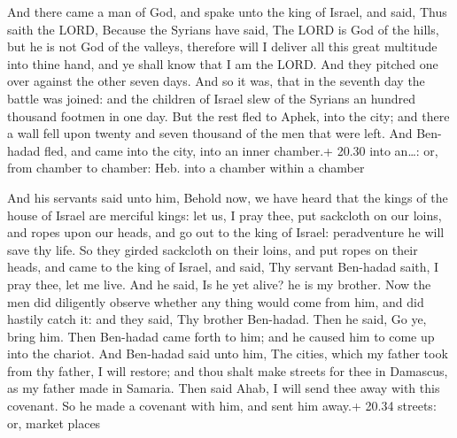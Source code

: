  And there came a man of God, and spake unto the king of
Israel, and said, Thus saith the LORD, Because the Syrians have said,
The LORD is God of the hills, but he is not God of the valleys,
therefore will I deliver all this great multitude into thine hand, and
ye shall know that I am the LORD.  And they pitched one
over against the other seven days. And so it was, that in the seventh
day the battle was joined: and the children of Israel slew of the
Syrians an hundred thousand footmen in one day.  But the
rest fled to Aphek, into the city; and there a wall fell upon twenty and
seven thousand of the men that were left. And Ben-hadad fled, and came
into the city, into an inner chamber.+ 20.30 into an\ldots: or, from
chamber to chamber: Heb. into a chamber within a chamber

 And his servants said unto him, Behold now, we have
heard that the kings of the house of Israel are merciful kings: let us,
I pray thee, put sackcloth on our loins, and ropes upon our heads, and
go out to the king of Israel: peradventure he will save thy life.
 So they girded sackcloth on their loins, and put ropes on
their heads, and came to the king of Israel, and said, Thy servant
Ben-hadad saith, I pray thee, let me live. And he said, Is he yet alive?
he is my brother.  Now the men did diligently observe
whether any thing would come from him, and did hastily catch it: and
they said, Thy brother Ben-hadad. Then he said, Go ye, bring him. Then
Ben-hadad came forth to him; and he caused him to come up into the
chariot.  And Ben-hadad said unto him, The cities, which my
father took from thy father, I will restore; and thou shalt make streets
for thee in Damascus, as my father made in Samaria. Then said Ahab, I
will send thee away with this covenant. So he made a covenant with him,
and sent him away.+ 20.34 streets: or, market places

